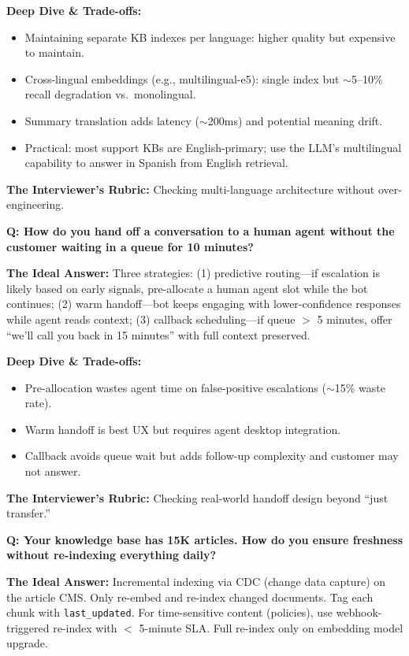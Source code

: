 \textbf{Deep Dive \& Trade-offs:}
\begin{itemize}
  \item Maintaining separate KB indexes per language: higher quality but expensive to maintain.
  \item Cross-lingual embeddings (e.g., multilingual-e5): single index but $\sim$5--10\% recall degradation vs.\ monolingual.
  \item Summary translation adds latency ($\sim$200ms) and potential meaning drift.
  \item Practical: most support KBs are English-primary; use the LLM's multilingual capability to answer in Spanish from English retrieval.
\end{itemize}

\textbf{The Interviewer's Rubric:} Checking multi-language architecture without over-engineering.

\textbf{Q: How do you hand off a conversation to a human agent without the customer waiting in a queue for 10 minutes?}

\textbf{The Ideal Answer:} Three strategies: (1) predictive routing---if escalation is likely based on early signals, pre-allocate a human agent slot while the bot continues; (2) warm handoff---bot keeps engaging with lower-confidence responses while agent reads context; (3) callback scheduling---if queue $>$ 5 minutes, offer ``we'll call you back in 15 minutes'' with full context preserved.

\textbf{Deep Dive \& Trade-offs:}
\begin{itemize}
  \item Pre-allocation wastes agent time on false-positive escalations ($\sim$15\% waste rate).
  \item Warm handoff is best UX but requires agent desktop integration.
  \item Callback avoids queue wait but adds follow-up complexity and customer may not answer.
\end{itemize}

\textbf{The Interviewer's Rubric:} Checking real-world handoff design beyond ``just transfer.''

\textbf{Q: Your knowledge base has 15K articles. How do you ensure freshness without re-indexing everything daily?}

\textbf{The Ideal Answer:} Incremental indexing via CDC (change data capture) on the article CMS. Only re-embed and re-index changed documents. Tag each chunk with \texttt{last\_updated}. For time-sensitive content (policies), use webhook-triggered re-index with $<$ 5-minute SLA. Full re-index only on embedding model upgrade.

